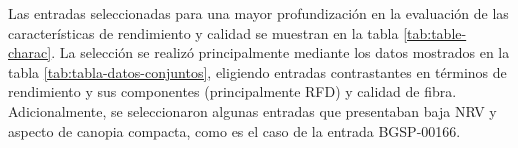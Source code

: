 \documentclass[12pt,oneside]{reedthesis}
\begin{document}
Las entradas seleccionadas para una mayor profundización en la evaluación de las características de rendimiento y calidad se muestran en la tabla \ref{tab:table-charac}. La selección se realizó principalmente mediante los datos mostrados en la tabla \ref{tab:tabla-datos-conjuntos}, eligiendo entradas contrastantes en términos de rendimiento y sus componentes (principalmente RFD) y calidad de fibra. Adicionalmente, se seleccionaron algunas entradas que presentaban baja NRV y aspecto de canopia compacta, como es el caso de la entrada BGSP-00166.

\begin{table}[!h]
\centering\centering
\caption{\label{tab:table-charac}Valores medios, error estándar (entre paréntesis) y prueba L.S.D. (diferencia mínima significativa) de Fisher para rendimiento de fibra, sus componentes y calidad.}
\centering
{}
\end{table}
\end{document}
